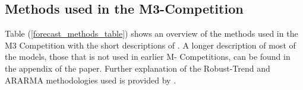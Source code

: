 \documentclass[12pt,a4paper]{article}
\begin{document}


\begin{center}
  \item  \subsection*{Methods used in the M3-Competition}
\end{center}

Table (\ref{forecast_methods_table}) shows an overview of the methods used in the M3 Competition with the short descriptions of \cite{MAKRIDAKIS2000}. A longer description of most of the models, those that is not used in earlier M- Competitions, can be found in the appendix of the paper. Further explanation of the Robust-Trend and ARARMA methodologies used is provided by \cite{Meade2000}.
\end{document}
